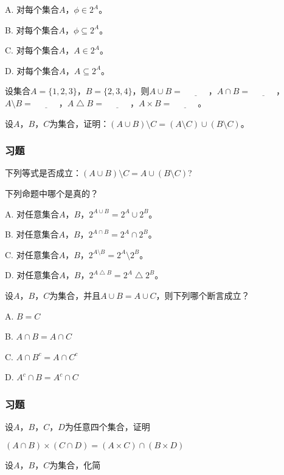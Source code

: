 \documentclass{beamer}
\begin{document}
\begin{CJK*}{UTF8}{gbsn}
\begin{frame}
\begin{Exercise}
    A. 对每个集合$A$，$\phi \in 2^A$。

    B. 对每个集合$A$，$\phi \subseteq 2^A$。

    C. 对每个集合$A$，$A \in 2^A$。

    D. 对每个集合$A$，$A \subseteq 2^A$。
  \end{Exercise}
  \begin{Exercise}
    设集合$A=\{1,2,3\}$，$B=\{2,3,4\}$，则$A\cup B=\underline{\quad\quad\quad}$，$A\cap B=\underline{\quad\quad\quad}$，$A\setminus B=\underline{\quad\quad\quad}$，$A\bigtriangleup B=\underline{\quad\quad\quad}$，$A\times B=\underline{\quad\quad\quad}$。
  \end{Exercise}
  \begin{Exercise}
   设$A$，$B$，$C$为集合，证明：$(A\cup B) \setminus C = (A\setminus C) \cup
   (B\setminus C)$。
  \end{Exercise}
\end{frame}
\begin{frame}
  \frametitle{习题}
    \begin{Exercise}
      下列等式是否成立：$(A\cup B) \setminus C = A \cup (B\setminus C)$?
    \end{Exercise}

  \begin{Exercise}
下列命题中哪个是真的？

A. 对任意集合$A$，$B$，$2^{A\cup B} = 2^A \cup 2^B$。

B. 对任意集合$A$，$B$，$2^{A\cap B} = 2^A \cap 2^B$。

C. 对任意集合$A$，$B$，$2^{A\setminus B} = 2^A \setminus 2^B$。

D. 对任意集合$A$，$B$，$2^{A\bigtriangleup B} = 2^A \bigtriangleup 2^B$。
  \end{Exercise}
  \begin{Exercise}
    设$A$，$B$，$C$为集合，并且$A\cup B = A \cup C$，则下列哪个断言成立？

    A. $B = C$

    B. $A \cap B = A \cap C$

    C. $A \cap B^c = A \cap C^c$

    D. $A^c \cap B = A^c \cap C$
  \end{Exercise}
\end{frame}
\begin{frame}
  \frametitle{习题}
  \begin{Exercise}
    设$A$，$B$，$C$，$D$为任意四个集合，证明

    $(A \cap B) \times (C \cap D) =
    (A\times C) \cap (B \times D)$
  \end{Exercise}
  \begin{Exercise}
   设$A$，$B$，$C$为集合，化简


\end{Exercise}
\end{frame}
\end{CJK*}
\end{document}
